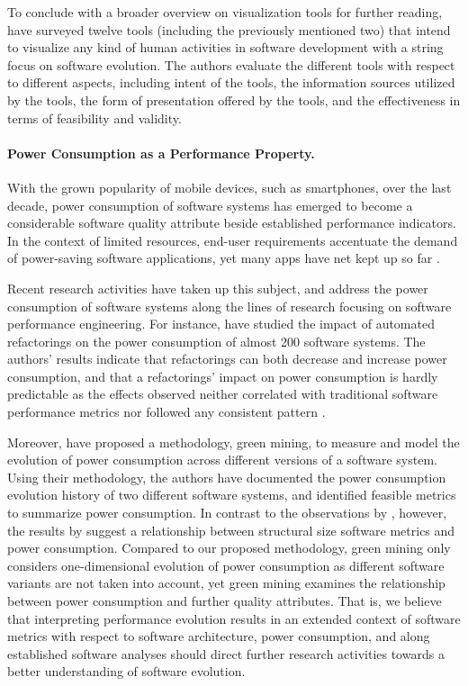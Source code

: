 To conclude with a broader overview on visualization tools for further reading,
\cite{storey_use_2005} have surveyed twelve tools (including the previously
mentioned two) that intend to visualize any kind of human activities in
software development with a string focus on software evolution. The authors
evaluate the different tools with respect to different aspects, including
intent of the tools, the information sources utilized by the tools, the form of
presentation offered by the tools, and the effectiveness in terms of
feasibility and validity.

\paragraph{Power Consumption as a Performance Property.}
With the grown popularity of mobile devices, such as smartphones, over the last
decade, power consumption of software systems has emerged to become a
considerable software quality attribute beside established performance
indicators. In the context of limited resources, end-user requirements
accentuate the demand of power-saving software applications, yet many apps have
net kept up so far \citep{li_empirical_2014}.
 
Recent research activities have taken up this subject, and address the power
consumption of software systems along the lines of research focusing on
software performance engineering. For instance, \cite{sahin_how_2014} have
studied the impact of automated refactorings on the power consumption of almost
200 software systems. The authors’ results indicate that refactorings can both
decrease and increase power consumption, and that a refactorings’ impact on
power consumption is hardly predictable as the effects observed neither
correlated with traditional software performance metrics nor followed any
consistent pattern \citep{sahin_how_2014}.

Moreover, \cite{hindle_green_2015} have proposed a methodology, green mining, to measure
and model the evolution of power consumption across different versions of a
software system. Using their methodology, the authors have documented the power
consumption evolution history of two different software systems, and identified
feasible metrics to summarize power consumption. In contrast to the
observations by \cite{sahin_how_2014}, however, the results by \cite{hindle_green_2015}
suggest a relationship between structural size software metrics and power
consumption. Compared to our proposed methodology, green mining only considers
one-dimensional evolution of power consumption as different software variants
are not taken into account, yet green mining examines the relationship between
power consumption and further quality attributes. That is, we believe that
interpreting performance evolution results in an extended context of software
metrics with respect to software architecture, power consumption, and along
established software analyses should direct further research activities towards
a better understanding of software evolution.

